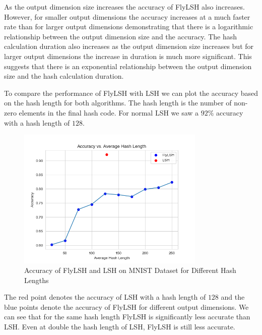 \documentclass[12pt, letterpaper]{article}
\begin{document}
As the output dimension size increases the accuracy of FlyLSH also increases. However, for smaller output dimensions the accuracy increases at a much faster rate than for larger output dimensions demonstrating that there is a logarithmic relationship between the output dimension size and the accuracy. The hash calculation duration also increases as the output dimension size increases but for larger output dimensions the increase in duration is much more significant. This suggests that there is an exponential relationship between the output dimension size and the hash calculation duration.

To compare the performance of FlyLSH with LSH we can plot the accuracy based on the hash length for both algorithms. The hash length is the number of non-zero elements in the final hash code. For normal LSH we saw a $92\%$ accuracy with a hash length of $128$.

\begin{figure}[H]
    \centering
    \includegraphics[width=0.8\textwidth]{fly_hash_compare_hash_length.png}
    \caption{Accuracy of FlyLSH and LSH on MNIST Dataset for Different Hash Lengths}
    \label{fig:fly_hash_compare_hash_length}
\end{figure}

The red point denotes the accuracy of LSH with a hash length of $128$ and the blue points denote the accuracy of FlyLSH for different output dimensions. We can see that for the same hash length FlyLSH is significantly less accurate than LSH. Even at double the hash length of LSH, FlyLSH is still less accurate. 
\end{document}
